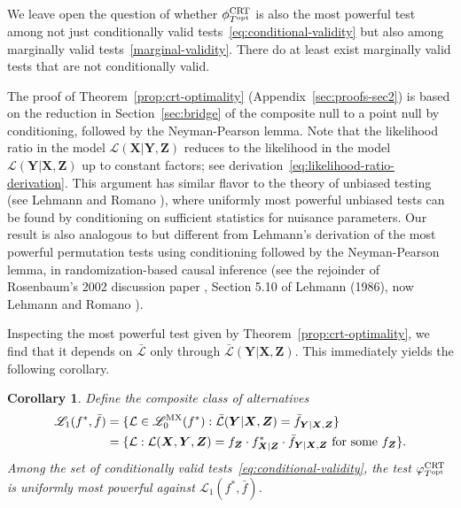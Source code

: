 \documentclass[12pt]{article}
\newtheorem{corollary}{Corollary}
\theoremstyle{definition}
\theoremstyle{remark}
\newcommand{\prx}{\bm X}
\newcommand{\srx}{X}
\newcommand{\prz}{\bm Z}
\newcommand{\srz}{Z}
\newcommand{\pry}{{\bm Y}}
\newcommand{\sry}{Y}
\def\CRT{\textnormal{CRT}}
\begin{document}
We leave open the question of whether $\phi^{\CRT}_{T^\textnormal{opt}}$ is also the most powerful test among not just conditionally valid tests~\eqref{eq:conditional-validity} but also among marginally valid tests~\eqref{marginal-validity}. There do at least exist marginally valid tests that are not conditionally valid.

The proof of Theorem~\ref{prop:crt-optimality} (Appendix~\ref{sec:proofs-sec2}) is based on the reduction in Section~\ref{sec:bridge} of the composite null to a point null by conditioning, followed by the Neyman-Pearson lemma. Note that the likelihood ratio in the model $\mathcal L(\prx|\pry, \prz)$ reduces to the likelihood in the model $\mathcal L(\pry|\prx, \prz)$ up to constant factors; see derivation~\eqref{eq:likelihood-ratio-derivation}. This argument has similar flavor to the theory of unbiased testing (see Lehmann and Romano \cite[Chapter 4]{TSH}), where uniformly most powerful unbiased tests can be found by conditioning on sufficient statistics for nuisance parameters. Our result is also analogous to but different from Lehmann's derivation of the most powerful permutation tests using conditioning followed by the Neyman-Pearson lemma, in randomization-based causal inference (see the rejoinder of Rosenbaum's 2002 discussion paper \cite{Rosenbaum2002}, Section 5.10 of Lehmann (1986), now Lehmann and Romano \cite[Section 5.9]{TSH}).

Inspecting the most powerful test given by Theorem~\ref{prop:crt-optimality}, we find that it depends on $\bar{\mathcal L}$ only through $\bar{\mathcal L}(\pry|\prx,\prz)$. This immediately yields the following corollary.

\begin{corollary} \label{cor:crt-optimality}
	Define the composite class of alternatives
	\begin{equation*}
	\begin{split}
	\mathscr L_1(f^*, \bar f) &= \{\mathcal L \in \mathscr L_0^{\textnormal{MX}}(f^*): \bar{\mathcal L}(\pry|\prx,\prz) = \bar f_{\pry|\prx,\prz}\} \\
	&= \{\mathcal L: \mathcal L(\prx,\pry,\prz) = f_{\prz} \cdot f^*_{\prx|\prz} \cdot \bar f_{\pry|\prx,\prz} \textnormal{ for some } f_{\prz}\}.
	\end{split}
	\end{equation*}
	Among the set of conditionally valid tests~\eqref{eq:conditional-validity}, the test $\varphi^{\CRT}_{T^{\textnormal{opt}}}$ is uniformly most powerful against $\mathscr L_1(f^*, \bar f)$.
\end{corollary}
\end{document}
